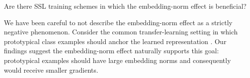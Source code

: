 \begin{question}
    Are there SSL training schemes in which the embedding-norm effect is beneficial?
\end{question}

We have been careful to not describe the embedding-norm effect as a strictly negative phenomenon. Consider the common transfer-learning setting in which prototypical class examples should anchor the learned representation \citep{prototypical_1, prototypical_2}. Our findings suggest the embedding-norm effect naturally supports this goal: prototypical examples should have large embedding norms and consequently would receive smaller gradients.